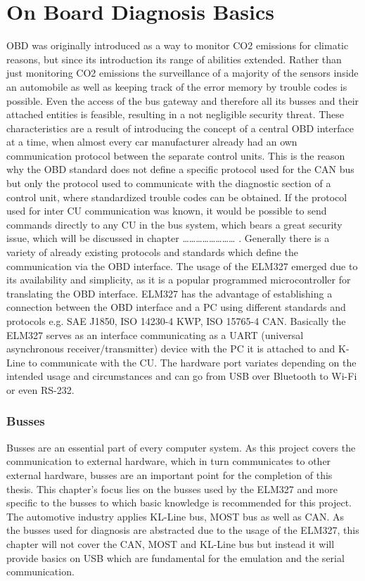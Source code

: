 
\chapter{On Board Diagnosis Basics}
OBD was originally introduced as a way to monitor CO2 emissions for climatic reasons, but since its introduction its range of abilities extended. 
Rather than just monitoring CO2 emissions the surveillance of a majority of the sensors inside an automobile as well as keeping track of the 
error memory by trouble codes is possible. Even the access of the bus gateway and therefore all its busses and their attached entities is feasible, 
resulting in a not negligible security threat. These characteristics are a result of introducing the concept of a central OBD interface at a time, 
when almost every car manufacturer already had an own communication protocol between the separate control units.
This is the reason why the OBD standard does not define a specific protocol used for the CAN bus but only the protocol used to communicate with the diagnostic section of a control unit, where standardized trouble codes can be obtained. If the protocol used for inter CU communication was known, it would be possible to send commands directly to any CU in the bus system, which bears a great security issue, which will be discussed in chapter …………………… .
Generally there is a variety of already existing protocols and standards which define the communication via the OBD interface. The usage of the ELM327 
emerged due to its availability and simplicity, as it is a popular programmed microcontroller for translating the OBD interface. ELM327 has the 
advantage of establishing a connection between the OBD interface and a PC using different standards and protocols e.g. SAE J1850, ISO 14230-4 KWP, 
ISO 15765-4 CAN. Basically the ELM327 serves as an interface communicating as a UART (universal asynchronous receiver/transmitter) device with the 
PC it is attached to and K-Line to communicate with the CU. The hardware port variates depending on the intended usage and circumstances and can go 
from USB over Bluetooth to Wi-Fi or even RS-232. 

\subsection{Busses}
Busses are an essential part of every computer system. As this project covers the communication to external hardware, which in turn communicates to other external hardware, busses are an important point for the completion of this thesis. This chapter’s focus lies on the busses used by the ELM327 and more specific to the busses to which basic knowledge is recommended for this project.  
The automotive industry applies KL-Line bus, MOST bus as well as CAN. As the busses used for diagnosis are abstracted due to the usage of the ELM327, this chapter will not cover the CAN, MOST and KL-Line bus but instead it will provide basics on USB which are fundamental for the emulation and the serial communication.

